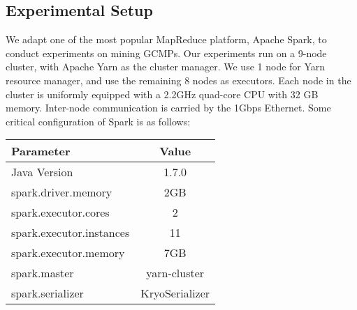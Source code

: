 %


\subsection{Experimental Setup}
We adapt one of the most popular MapReduce platform, Apache Spark, 
to conduct experiments on mining GCMPs. 
Our experiments run on a 9-node cluster, with Apache Yarn as
the cluster manager. We use 1 node for Yarn resource manager, 
and use the remaining 8 nodes as executors. Each node in the cluster
is uniformly equipped with a 2.2GHz quad-core CPU with 32 GB memory. 
Inter-node communication is carried by 
the 1Gbps Ethernet.  Some critical configuration of Spark is 
as follows:
\begin{table} [h]
\centering
\begin{tabular}{|l|c|}
\hline 
Parameter & Value  \\ 
\hline 
Java Version & 1.7.0 \\ 
\hline 
spark.driver.memory & 2GB \\ 
\hline 
spark.executor.cores & 2  \\ 
\hline 
spark.executor.instances & 11 \\ 
\hline 
spark.executor.memory & 7GB \\ 
\hline 
spark.master & yarn-cluster \\
\hline 
spark.serializer & KryoSerializer \\ 
\hline 
\end{tabular} 
\end{table}

